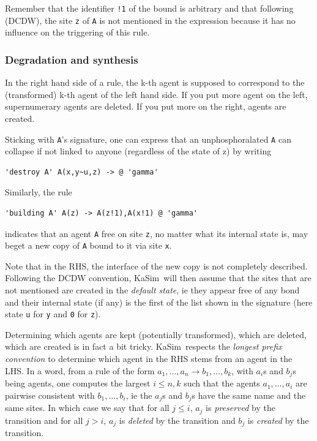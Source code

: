 \documentclass[11pt]{book}
\def\KaSim{\textsf{KaSim}}
\def\ttt#1{\texttt{#1}}
\def\rar{\rightarrow}
\def\ie{ie }
\def\via{via }
\begin{document}
Remember that the identifier \ttt{!1} of the bound is arbitrary and
that following (DCDW), the site \ttt{z}
of \ttt{A} is not mentioned in the expression because it has no
influence on the triggering of this rule.

\subsubsection*{Degradation and synthesis}
In the right hand side of a rule, the k-th agent is supposed to
correspond to the (transformed) k-th agent of the left hand side. If
you put more agent on the left, supernumerary agents are deleted. If
you put more on the right, agents are created.

Sticking with \ttt{A}'s signature, one can
express that an unphosphoralated \ttt{A} can collapse if not linked to
anyone (regardless of the state of z) by writing
\begin{lstlisting}[language=kappa]
'destroy A' A(x,y~u,z) -> @ 'gamma'
\end{lstlisting}

Similarly, the rule
\begin{lstlisting}[language=kappa]
'building A' A(z) -> A(z!1),A(x!1) @ 'gamma'
\end{lstlisting}
indicates that an agent \ttt{A} free on site \ttt{z}, no matter what
its internal state is, may beget a new copy of \ttt{A} bound to it
\via site \ttt{x}.

Note that in the RHS, the interface of the new copy is not completely
described. Following the DCDW convention, \KaSim~will then assume that the sites that are not
mentioned are created in the \emph{default state}, \ie they appear free of any bond and their internal state
(if any) is the first of the list shown in the signature (here state \ttt{u} for \ttt{y} and \ttt{0} for \ttt{z}).

Determining which agents are kept (potentially transformed), which
are deleted, which are created is in fact a bit tricky.
\KaSim~respects the \emph{longest prefix convention} to determine which agent in the RHS stems from an
agent in the LHS.  In a word, from a rule of the form
$a_1,\dots,a_n\rar b_1,\dots,b_k$, with $a_i$s and $b_j$s being
agents, one computes the largest $i\leq n,k$ such that the agents
$a_1,\dots,a_i$ are pairwise consistent with $b_1,\dots,b_i$, \ie the
$a_j$s and $b_j$s have the same name and the same sites. In which case
we say that for all $j\leq i$, $a_j$ is \emph{preserved} by the
transition and for all $j>i$, $a_j$ is \emph{deleted} by the
transition and $b_j$ is \emph{created} by the transition.
\end{document}
